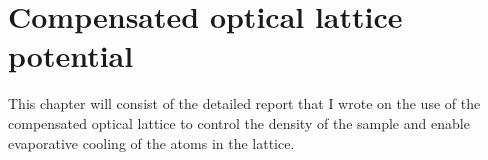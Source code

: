 \documentclass[oneside,11pt]{memoir}
\begin{document}

\chapter{Compensated optical lattice potential}

This chapter will consist of the detailed report that I wrote on the use of the compensated optical lattice to control the density of the sample and enable evaporative cooling of the atoms in the lattice. 

\end{document}
